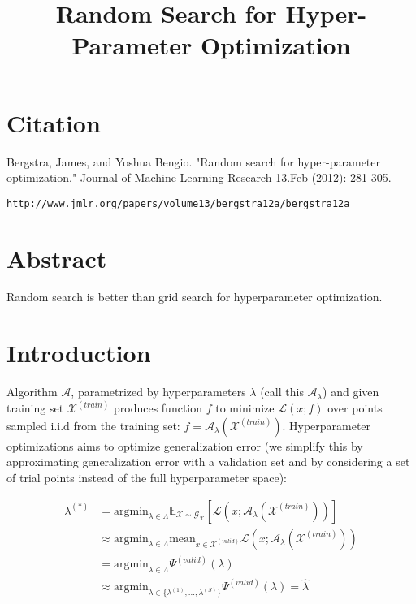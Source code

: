 \documentclass[a4paper]{article}
\title{Random Search for Hyper-Parameter Optimization}
\date{}
\begin{document}
\maketitle

\section{Citation}
Bergstra, James, and Yoshua Bengio. "Random search for hyper-parameter optimization." Journal of Machine Learning Research 13.Feb (2012): 281-305.

\begin{verbatim}
http://www.jmlr.org/papers/volume13/bergstra12a/bergstra12a
\end{verbatim}

\section{Abstract}
Random search is better than grid search for hyperparameter optimization.

\section{Introduction}
Algorithm $\mathcal{A}$, parametrized by hyperparameters $\lambda$ (call this
$\mathcal{A}_{\lambda}$) and given training set $\mathcal{X}^{(train)}$ produces
function $f$ to minimize $\mathcal{L}(x; f)$ over points sampled i.i.d from the
training set: $f = \mathcal{A}_{\lambda}(\mathcal{X}^{(train)})$. Hyperparameter
optimizations aims to optimize generalization error (we simplify this by
approximating generalization error with a validation set and by considering
a set of trial points instead of the full hyperparameter space):

\begin{align}
  \lambda^{(*)} & = \text{argmin}_{\lambda \in \Lambda}{
  \mathbb{E}_{\mathcal{X} \sim \mathcal{G}_{\mathcal{X}}}[
  \mathcal{L}(x; \mathcal{A}_{\lambda}(\mathcal{X}^{(train)}))
  ]} \\
  & \approx \text{argmin}_{\lambda \in \Lambda}{
  \text{mean}_{x \in \mathcal{X}^{(valid)}}
  \mathcal{L}(x; \mathcal{A}_{\lambda}(\mathcal{X}^{(train)}))
  } \\
  & = \text{argmin}_{\lambda \in \Lambda}{\Psi^{(valid)}(\lambda)} \\
  & \approx \text{argmin}_{\lambda \in \{\lambda^{(1)}, ..., \lambda^{(S)}\}}{
  \Psi^{(valid)}(\lambda)} = \hat{\lambda}
\end{align}
\end{document}

